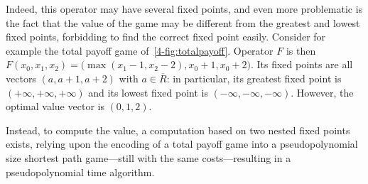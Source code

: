Indeed, this operator may have several fixed points, and even more
problematic is the fact that the value of the game may be different
from the greatest and lowest fixed points, forbidding to find the
correct fixed point easily. Consider for example the total payoff game
of~\cref{4-fig:totalpayoff}. Operator $F$ is then
$F(x_0,x_1,x_2) = \big(\max(x_1-1,x_2-2),x_0+1,x_0+2\big)$. Its fixed
points are all vectors $(a,a+1,a+2)$ with $a\in \overline R$: in
particular, its greatest fixed point is $(+\infty, +\infty, +\infty)$
and its lowest fixed point is $(-\infty, -\infty, -\infty)$. However,
the optimal value vector is $(0,1,2)$.

Instead, to compute the value, a computation based on two nested fixed
points exists, relying upon the encoding of a total payoff game into a
pseudopolynomial size shortest path game---still with the same
costs---resulting in a pseudopolynomial time algorithm.
\cite{Brihaye&Geeraerts&HaddadA&Monmege:2017}


